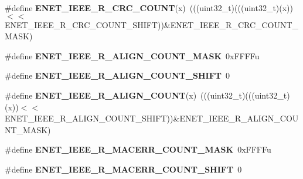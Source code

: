 \begin{DoxyCompactItemize}
\item 
\#define {\bfseries E\+N\+E\+T\+\_\+\+I\+E\+E\+E\+\_\+\+R\+\_\+\+C\+R\+C\+\_\+\+C\+O\+U\+NT}(x)~(((uint32\+\_\+t)(((uint32\+\_\+t)(x))$<$$<$E\+N\+E\+T\+\_\+\+I\+E\+E\+E\+\_\+\+R\+\_\+\+C\+R\+C\+\_\+\+C\+O\+U\+N\+T\+\_\+\+S\+H\+I\+FT))\&E\+N\+E\+T\+\_\+\+I\+E\+E\+E\+\_\+\+R\+\_\+\+C\+R\+C\+\_\+\+C\+O\+U\+N\+T\+\_\+\+M\+A\+SK)\hypertarget{group__ENET__Register__Masks_ga5f2922a546db478712a69bde97e43507}{}\label{group__ENET__Register__Masks_ga5f2922a546db478712a69bde97e43507}

\item 
\#define {\bfseries E\+N\+E\+T\+\_\+\+I\+E\+E\+E\+\_\+\+R\+\_\+\+A\+L\+I\+G\+N\+\_\+\+C\+O\+U\+N\+T\+\_\+\+M\+A\+SK}~0x\+F\+F\+F\+Fu\hypertarget{group__ENET__Register__Masks_ga43a415932380ce1dd7a3c8dded1421a7}{}\label{group__ENET__Register__Masks_ga43a415932380ce1dd7a3c8dded1421a7}

\item 
\#define {\bfseries E\+N\+E\+T\+\_\+\+I\+E\+E\+E\+\_\+\+R\+\_\+\+A\+L\+I\+G\+N\+\_\+\+C\+O\+U\+N\+T\+\_\+\+S\+H\+I\+FT}~0\hypertarget{group__ENET__Register__Masks_ga6a0f2d8593a546427d3f84a22dc05343}{}\label{group__ENET__Register__Masks_ga6a0f2d8593a546427d3f84a22dc05343}

\item 
\#define {\bfseries E\+N\+E\+T\+\_\+\+I\+E\+E\+E\+\_\+\+R\+\_\+\+A\+L\+I\+G\+N\+\_\+\+C\+O\+U\+NT}(x)~(((uint32\+\_\+t)(((uint32\+\_\+t)(x))$<$$<$E\+N\+E\+T\+\_\+\+I\+E\+E\+E\+\_\+\+R\+\_\+\+A\+L\+I\+G\+N\+\_\+\+C\+O\+U\+N\+T\+\_\+\+S\+H\+I\+FT))\&E\+N\+E\+T\+\_\+\+I\+E\+E\+E\+\_\+\+R\+\_\+\+A\+L\+I\+G\+N\+\_\+\+C\+O\+U\+N\+T\+\_\+\+M\+A\+SK)\hypertarget{group__ENET__Register__Masks_ga6e6197d91cb433929a390c9355a43673}{}\label{group__ENET__Register__Masks_ga6e6197d91cb433929a390c9355a43673}

\item 
\#define {\bfseries E\+N\+E\+T\+\_\+\+I\+E\+E\+E\+\_\+\+R\+\_\+\+M\+A\+C\+E\+R\+R\+\_\+\+C\+O\+U\+N\+T\+\_\+\+M\+A\+SK}~0x\+F\+F\+F\+Fu\hypertarget{group__ENET__Register__Masks_gaec114f8a37da297fa258d22d3d275def}{}\label{group__ENET__Register__Masks_gaec114f8a37da297fa258d22d3d275def}

\item 
\#define {\bfseries E\+N\+E\+T\+\_\+\+I\+E\+E\+E\+\_\+\+R\+\_\+\+M\+A\+C\+E\+R\+R\+\_\+\+C\+O\+U\+N\+T\+\_\+\+S\+H\+I\+FT}~0\hypertarget{group__ENET__Register__Masks_ga80d5b1a8081a8c2f0601dea66aeb5d04}{}\label{group__ENET__Register__Masks_ga80d5b1a8081a8c2f0601dea66aeb5d04}


\end{DoxyCompactItemize}
